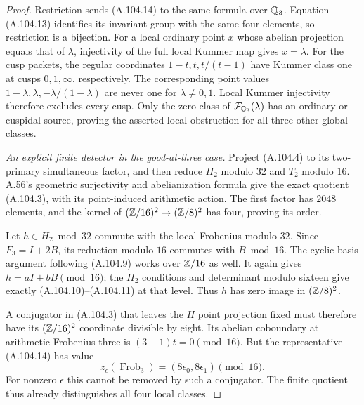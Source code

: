 \begin{proof}
Restriction sends (A.104.14) to the
same formula over $\mathbb Q_3$.
Equation (A.104.13) identifies its
invariant group with the same four
elements, so restriction is a bijection.
For a local ordinary point $x$ whose
abelian projection equals that of
$\lambda$, injectivity of the full
local Kummer map gives $x=\lambda$.
For the cusp packets, the regular
coordinates $1-t,t,t/(t-1)$ have
Kummer class one at cusps $0,1,\infty$,
respectively.  The corresponding point
values $1-\lambda,\lambda,-\lambda/(1-\lambda)$
are never one for $\lambda\ne0,1$.
Local Kummer injectivity therefore
excludes every cusp.
Only the zero class of
$\mathcal F_{\mathbb Q_3}(\lambda)$ has an
ordinary or cuspidal source, proving
the asserted local obstruction for
all three other global classes.

\emph{An explicit finite detector in the good-at-three case.}
Project (A.104.4) to its two-primary
simultaneous factor, and then reduce
$H_2$ modulo $32$ and $T_2$ modulo $16$.
A.56's geometric surjectivity and
abelianization formula give the exact
quotient (A.104.3), with its point-induced
arithmetic action.  The first factor
has $2048$ elements, and the kernel
of $(\mathbb Z/16)^2\to(\mathbb Z/8)^2$ has four,
proving its order.

Let $h\in H_2\bmod32$ commute with
the local Frobenius modulo $32$.
Since $F_3=I+2B$, its reduction modulo
$16$ commutes with $B\bmod16$.
The cyclic-basis argument following
(A.104.9) works over $\mathbb Z/16$ as well.
It again gives $h=aI+bB\pmod{16}$;
the $H_2$ conditions and determinant
modulo sixteen give exactly
(A.104.10)--(A.104.11) at that level.
Thus $h$ has zero image in
$(\mathbb Z/8)^2$.

A conjugator in (A.104.3) that leaves
the $H$ point projection fixed must
therefore have its $(\mathbb Z/16)^2$
coordinate divisible by eight.
Its abelian coboundary at arithmetic
Frobenius three is
$(3-1)t=0\pmod{16}$.
But the representative (A.104.14)
has value
\[
                z_\epsilon(\operatorname{Frob}_3)
                  =(8\epsilon_0,8\epsilon_1)\pmod{16}.
\tag{A.104.15}
\]
For nonzero $\epsilon$ this cannot be
removed by such a conjugator.
The finite quotient thus already
distinguishes all four local classes.


\end{proof}
